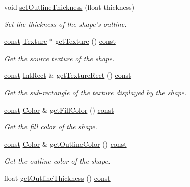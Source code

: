 \begin{DoxyCompactItemize}
void \hyperlink{classsf_1_1_shape_a5ad336ad74fc1f567fce3b7e44cf87dc}{set\-Outline\-Thickness} (float thickness)
\begin{DoxyCompactList}\small\item\em Set the thickness of the shape's outline. \end{DoxyCompactList}\item 
\hyperlink{term__entry_8h_a57bd63ce7f9a353488880e3de6692d5a}{const} \hyperlink{classsf_1_1_texture}{Texture} $\ast$ \hyperlink{classsf_1_1_shape_a1bf27ac425fcce36efd0eed67531a403}{get\-Texture} () \hyperlink{term__entry_8h_a57bd63ce7f9a353488880e3de6692d5a}{const} 
\begin{DoxyCompactList}\small\item\em Get the source texture of the shape. \end{DoxyCompactList}\item 
\hyperlink{term__entry_8h_a57bd63ce7f9a353488880e3de6692d5a}{const} \hyperlink{namespacesf_a1b1279ab06950b96686cffaacb72fed5}{Int\-Rect} \& \hyperlink{classsf_1_1_shape_af7c4c80a435b85a622812711cf510439}{get\-Texture\-Rect} () \hyperlink{term__entry_8h_a57bd63ce7f9a353488880e3de6692d5a}{const} 
\begin{DoxyCompactList}\small\item\em Get the sub-\/rectangle of the texture displayed by the shape. \end{DoxyCompactList}\item 
\hyperlink{term__entry_8h_a57bd63ce7f9a353488880e3de6692d5a}{const} \hyperlink{classsf_1_1_color}{Color} \& \hyperlink{classsf_1_1_shape_ad7f7fe601a8bb24efe9aa77809a35c12}{get\-Fill\-Color} () \hyperlink{term__entry_8h_a57bd63ce7f9a353488880e3de6692d5a}{const} 
\begin{DoxyCompactList}\small\item\em Get the fill color of the shape. \end{DoxyCompactList}\item 
\hyperlink{term__entry_8h_a57bd63ce7f9a353488880e3de6692d5a}{const} \hyperlink{classsf_1_1_color}{Color} \& \hyperlink{classsf_1_1_shape_a4fa7d3bf5ee2332f6b9d9bebe9b1e2fd}{get\-Outline\-Color} () \hyperlink{term__entry_8h_a57bd63ce7f9a353488880e3de6692d5a}{const} 
\begin{DoxyCompactList}\small\item\em Get the outline color of the shape. \end{DoxyCompactList}\item 
float \hyperlink{classsf_1_1_shape_ac66f917b41eda6159a8ba6571d77f2ad}{get\-Outline\-Thickness} () \hyperlink{term__entry_8h_a57bd63ce7f9a353488880e3de6692d5a}{const} 

\end{DoxyCompactItemize}
